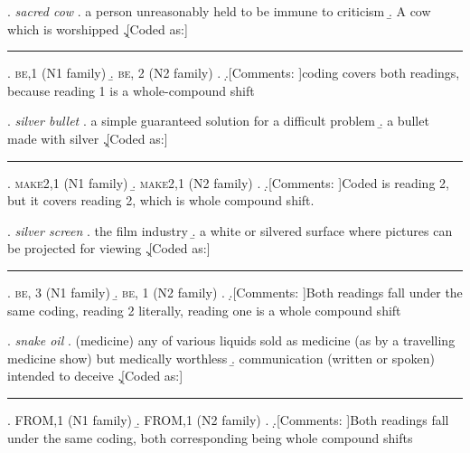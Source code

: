 \ex. \emph{sacred cow}
\a. a person unreasonably held to be immune to criticism 
\b. A cow which is worshipped
\c.[Coded as:] {\rule{4cm}{0cm}}
\a. \textsc{be},1 (N1 family)
\b. \textsc{be}, 2 (N2 family)
\z.
\d.[Comments: ]coding covers both readings, because reading 1 is a whole-compound shift


\pagebreak[4]
\ex. \emph{silver bullet}
\a. a simple guaranteed solution for a difficult problem
\b. a bullet made with silver
\c.[Coded as:] {\rule{4cm}{0cm}}
\a. \textsc{make2},1 (N1 family)
\b. \textsc{make2},1 (N2 family)
\z.
\d.[Comments: ]Coded is reading 2, but it covers reading 2, which is whole compound shift.

\pagebreak[3]
\ex. \emph{silver screen}
\a. the film industry
\b. a white or silvered surface where pictures can be projected for viewing
\c.[Coded as:] {\rule{4cm}{0cm}}
\a. \textsc{be}, 3 (N1 family)
\b. \textsc{be}, 1 (N2 family)
\z.
\d.[Comments: ]Both readings fall under the same coding, reading 2 literally, reading one is a whole compound shift

\ex. \emph{snake oil}
\a. (medicine) any of various liquids sold as medicine (as by a travelling medicine show) but medically worthless 
\b. communication (written or spoken) intended to deceive
\c.[Coded as:] {\rule{4cm}{0cm}}
\a. FROM,1 (N1 family)
\b. FROM,1 (N2 family)
\z.
\d.[Comments: ]Both readings fall under the same coding, both corresponding being whole compound shifts


